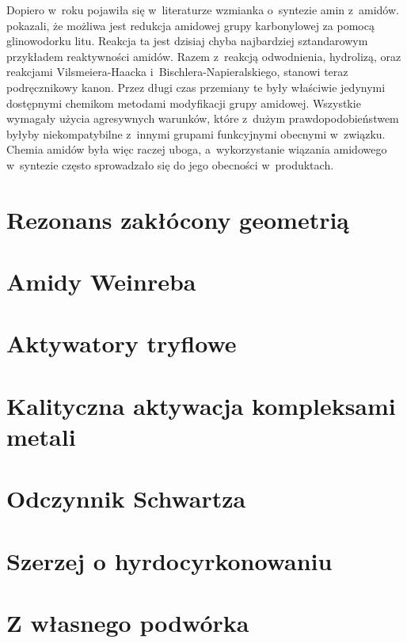 Dopiero w~roku \citeyear{brown48} pojawiła się w~literaturze wzmianka o~syntezie amin z~amidów.
\citeauthor{brown48} pokazali, że możliwa jest redukcja amidowej grupy karbonylowej za pomocą glinowodorku litu\autocite{brown48}.
Reakcja ta jest dzisiaj chyba najbardziej sztandarowym przykładem reaktywności amidów.
Razem z~reakcją odwodnienia, hydrolizą, oraz reakcjami Vilsmeiera-Haacka i~Bischlera-Napieralskiego,
stanowi teraz podręcznikowy kanon.
Przez długi czas przemiany te były właściwie jedynymi dostępnymi chemikom metodami modyfikacji grupy amidowej.
Wszystkie wymagały użycia agresywnych warunków,
które z~dużym prawdopodobieństwem byłyby niekompatybilne z~innymi grupami funkcyjnymi obecnymi w~związku.
Chemia amidów była więc raczej uboga, a~wykorzystanie wiązania amidowego w~syntezie często sprowadzało się do jego obecności w~produktach.

\section{Rezonans zakłócony geometrią}

\section{Amidy Weinreba}

\section{Aktywatory tryflowe}

\section{Kalityczna aktywacja kompleksami metali}

\section{Odczynnik Schwartza}

\section{Szerzej o hyrdocyrkonowaniu}

\section{Z własnego podwórka}